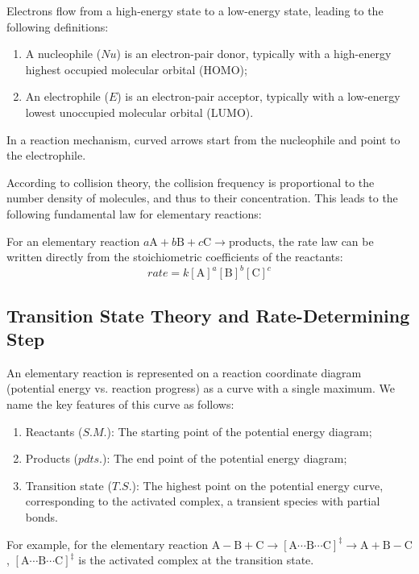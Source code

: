 Electrons flow from a high-energy state to a low-energy state, leading to the following definitions:

\begin{definition}
  \begin{enumerate}
    \item A nucleophile ($Nu$) is an electron-pair donor, typically with a high-energy highest occupied molecular orbital (HOMO);
    \item An electrophile ($E$) is an electron-pair acceptor, typically with a low-energy lowest unoccupied molecular orbital (LUMO).
  \end{enumerate}
\end{definition}
In a reaction mechanism, curved arrows start from the nucleophile and point to the electrophile.

According to collision theory, the collision frequency is proportional to the number density of molecules, and thus to their concentration. This leads to the following fundamental law for elementary reactions:

\begin{proposition}
For an elementary reaction $a\text{A} + b\text{B} +c\text{C}\rightarrow \text{products}$, the rate law can be written directly from the stoichiometric coefficients of the reactants:
$$rate = k[\text{A}]^a[\text{B}]^b[\text{C}]^c$$
\end{proposition}

\subsection{Transition State Theory and Rate-Determining Step}

An elementary reaction is represented on a reaction coordinate diagram (potential energy vs. reaction progress) as a curve with a single maximum. We name the key features of this curve as follows:

\begin{definition}
\begin{enumerate}
  \item Reactants ($S.M.$): The starting point of the potential energy diagram;
  \item Products ($pdts.$): The end point of the potential energy diagram;
  \item Transition state ($T.S.$): The highest point on the potential energy curve, corresponding to the activated complex, a transient species with partial bonds.
\end{enumerate}
\end{definition}
For example, for the elementary reaction $\text{A}-\text{B} + \text{C} \rightarrow [\text{A}\cdots \text{B}\cdots \text{C}]^\ddagger \rightarrow \text{A} + \text{B}-\text{C}$, $[\text{A}\cdots \text{B}\cdots \text{C}]^\ddagger$ is the activated complex at the transition state.

